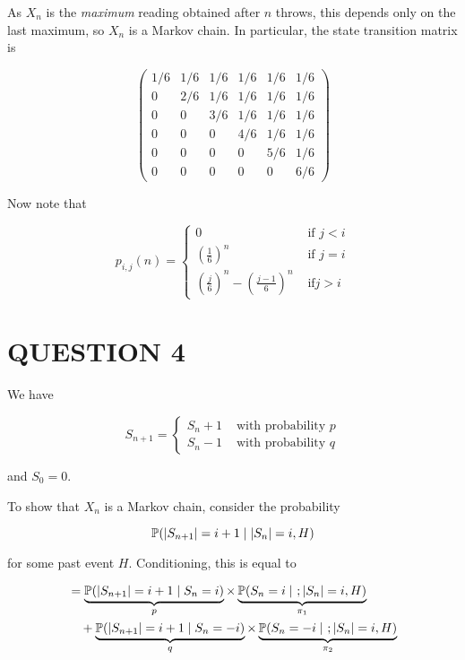 \documentclass[a4paper]{article}
\begin{document}
As $ X_{n} $ is the \emph{maximum} reading obtained after $ n $ throws, this depends only on the last maximum, so $ X_{n} $ is a Markov chain. In particular, the state transition matrix is


\[ \begin{pmatrix}
1/6 & 1/6 & 1/6 & 1/6 & 1/6 & 1/6  \\
0 & 2/6 & 1/6 & 1/6 & 1/6 & 1/6  \\
0 & 0 & 3/6 & 1/6 & 1/6 & 1/6  \\
0 & 0 & 0 & 4/6 & 1/6 & 1/6 \\
0 & 0 & 0 & 0 & 5/6 & 1/6  \\
0 & 0 & 0 & 0 & 0 & 6/6 
\end{pmatrix} \]


Now note that

\[ p_{i,j}(n) = \begin{cases} 0  & \text{ if } j < i \\ \left( \frac{1}{6} \right)^{n}  & \text{ if } j = i \\
\left(  \frac{j}{6} \right)^{n} - \left(  \frac{j-1}{6} \right)^{n} & \text{ if} j > i   \end{cases} \]


\section{QUESTION 4}

We have

\[ S_{n+1} = \begin{cases} S_{n} + 1  & \text{ with probability } p  \\ S_{n} - 1& \text{ with probability } q \end{cases} \]

and $ S_{0} = 0 $.

To show that $ X_{n} $ is a Markov chain, consider the probability 

\[ \P (  | S_{n+1} | = i + 1 \; | \; |  S_{n} | = i, H ) \]

for some past event $ H $. Conditioning, this is equal to

\begin{align*}
& = \underbrace{\P (  | S_{n+1} | = i + 1 \; | \;   S_{n} = i )}_{p} \times \underbrace{\P (  S_{n} = i \; | \ ; |  S_{n} | = i, H)}_{\pi_{1}} \\
& \quad + \underbrace{\P (  | S_{n+1} | = i + 1 \; | \;   S_{n} = - i )}_{q} \times \underbrace{\P (  S_{n} = - i \; | \ ; |  S_{n} | = i, H)}_{\pi_{2}} 
\end{align*}
\end{document}
